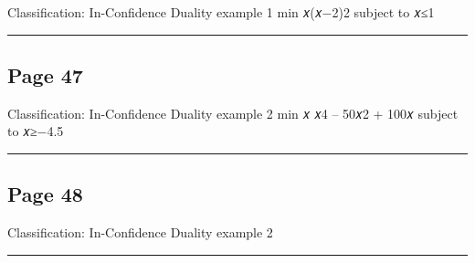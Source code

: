 \documentclass[
]{article}
\begin{document}
Classification: In-Confidence Duality example 1 min 𝑥(𝑥−2)2 subject to
𝑥≤1

\begin{center}\rule{0.5\linewidth}{0.5pt}\end{center}

\subsection{Page 47}\label{page-47}

Classification: In-Confidence Duality example 2 min 𝑥 𝑥4 -- 50𝑥2 + 100𝑥
subject to 𝑥≥−4.5

\begin{center}\rule{0.5\linewidth}{0.5pt}\end{center}

\subsection{Page 48}\label{page-48}

Classification: In-Confidence Duality example 2

\begin{center}\rule{0.5\linewidth}{0.5pt}\end{center}
\end{document}
